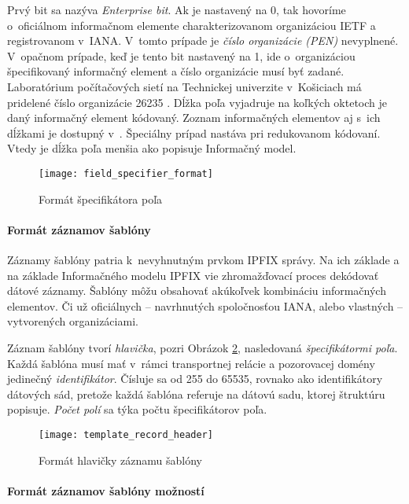 Prvý bit sa nazýva \emph{Enterprise bit}.
Ak je nastavený na 0, tak hovoríme o~oficiálnom informačnom elemente charakterizovanom organizáciou IETF a 
registrovanom v~IANA. 
V~tomto prípade je \emph{číslo organizácie (PEN)} nevyplnené. V~opačnom prípade, 
keď je tento bit nastavený na 1, ide o~organizáciou špecifikovaný informačný element a číslo organizácie
musí byť zadané. Laboratórium počítačových sietí na Technickej univerzite v~Košiciach má pridelené číslo 
organizácie 26235 \citep{pen}.
Dĺžka poľa vyjadruje na koľkých oktetoch je daný informačný element kódovaný. 
Zoznam informačných elementov aj s~ich dĺžkami je dostupný v~\citep{rfc5102}.
Špeciálny prípad nastáva pri redukovanom kódovaní. Vtedy je dĺžka poľa menšia ako popisuje 
Informačný model. 
 
\begin{figure}[ht!]
\centering
\texttt{[image: field\_specifier\_format]}
\caption{Formát špecifikátora poľa}\label{o:field_specifier_format}
\end{figure}



\paragraph{Formát záznamov šablóny}

Záznamy šablóny patria k~nevyhnutným prvkom IPFIX správy. Na ich základe a na základe Informačného modelu
IPFIX \citep{rfc5102} vie zhromažďovací proces dekódovať dátové záznamy.
Šablóny môžu obsahovať akúkoľvek kombináciu informačných elementov. Či už oficiálnych -- navrhnutých 
spoločnosťou IANA, alebo vlastných -- vytvorených organizáciami.

Záznam šablóny tvorí \emph{hlavička}, pozri Obrázok \ref{o:template_record_header}, nasledovaná 
\emph{špecifikátormi poľa}. 
Každá šablóna musí mať v~rámci transportnej relácie a pozorovacej domény jedinečný \emph{identifikátor}. 
Čísluje sa od 255 do 65535, rovnako ako identifikátory dátových sád, pretože každá šablóna referuje 
na dátovú sadu, ktorej štruktúru popisuje. \emph{Počet polí} sa týka počtu 
špecifikátorov poľa.

\begin{figure}[ht!]
\centering
\texttt{[image: template\_record\_header]}
\caption{Formát hlavičky záznamu šablóny}\label{o:template_record_header}
\end{figure}



\paragraph{Formát záznamov šablóny možností}

